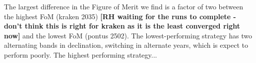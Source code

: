 The largest difference in the Figure of Merit we find is a factor of two between the highest FoM (kraken 2035) \textbf{[RH waiting for the runs to complete - don't think this is right for kraken as it is the least converged right now]} and the lowest FoM (pontus 2502). The lowest-performing strategy has two alternating bands in declination, switching in alternate years, which is expect to perform poorly. The highest performing strategy...  



